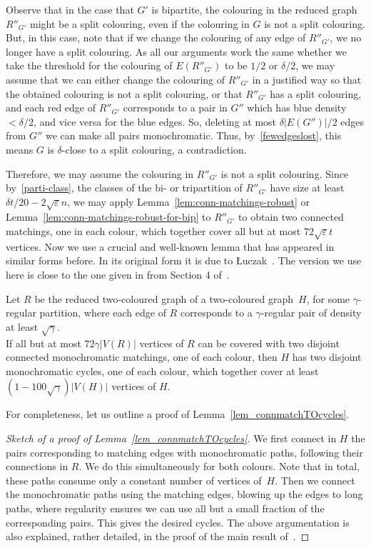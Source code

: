 \documentclass[a4paper,10pt]{article}
\let\eps\varepsilon
\begin{document}
Observe that in the case that $G'$ is bipartite, the colouring in the reduced graph $R''_{G'}$ might be a split colouring, even if the colouring in $G$ is not a split colouring. But, in this case, note that if we change the colouring of any edge of $R''_{G'}$, we no longer have a split colouring.
As all our arguments work the same whether we take the threshold for the colouring of $E(R''_{G'})$ to be $1/2$ or $\delta/2$, we may assume that we can either change the colouring of $R''_{G'}$ in a justified way so that the obtained colouring is not a split colouring, or that $R''_{G'}$ has a split colouring, and each red edge of $R''_{G'}$ corresponds to a pair in $G''$ which has blue density $<\delta/2$, and vice versa for the blue edges. So, deleting at most $\delta |E(G'')|/2$ edges from $G''$ we can make all pairs monochromatic. Thus, by~\eqref{fewedgeslost}, this means $G$ is $\delta$-close to a split colouring, a contradiction.

Therefore, we may assume the colouring in  $R''_{G'}$ is not a split colouring. Since by~\eqref{parti-class}, the classes of the bi- or tripartition of $R''_{G'}$ have size at least  $\delta t/20 - 2\sqrt\eps n$, we may apply Lemma~\ref{lem:conn-matchings-robust} or Lemma~\ref{lem:conn-matchings-robust-for-bip} to $R''_{G'}$ to obtain two connected matchings, one in each colour, which together cover all but at most $72\sqrt\eps t$ vertices.
Now we use a crucial and well-known lemma that has appeared in similar forms before. In its original form it is due to \L uczak~\cite{Luc99}. 
The version we use here is close to the one given in from Section 4 of~\cite{GRSS11}.

\begin{lemma}\label{lem_connmatchTOcycles}
Let $R$ be the reduced two-coloured graph of a two-coloured graph~$H$, for some $\gamma$-regular partition, where each edge of $R$ corresponds to a $\gamma$-regular pair of density at least $\sqrt\gamma$.\\
If all but at most $72 \gamma |V(R)|$ vertices of $R$ can be covered with two disjoint connected monochromatic matchings, one of each colour, then $H$ has two disjoint monochromatic cycles, one of each colour, which together cover at least $(1-100\sqrt\gamma)|V(H)|$ vertices of $H$.
\end{lemma}

For completeness, let us outline  a proof of Lemma~\ref{lem_connmatchTOcycles}. 

\begin{proof}[Sketch of a proof of Lemma~\ref{lem_connmatchTOcycles}]
We first connect in $H$ the pairs corresponding to matching edges with monochromatic paths, following their connections in $R$. 
We do this simultaneously for both colours. 
Note that in total, these paths consume only a constant number of vertices of~$H$.
Then we connect the monochromatic paths using the matching edges, blowing up the edges to long paths, where regularity ensures we can use all but a small fraction of the corresponding pairs. 
This gives the desired cycles.
The above argumentation is also explained, rather detailed, in the proof of the main result of~\cite{GRSS06b}.
\end{proof}
\end{document}
